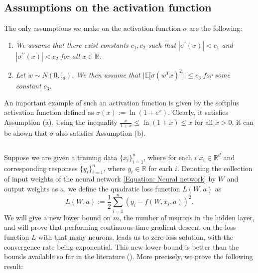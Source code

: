 \documentclass[a4paper,11pt]{amsart}
\newcommand{\IE}{\mathbb{E}}
\theoremstyle{definition}
\theoremstyle{plain}
\theoremstyle{remark}
\newcommand{\IR}{\mathbb{R}}
\begin{document}
\subsection*{Assumptions on the activation function}
The only assumptions we make on the activation function $\sigma$ are the following:
\begin{enumerate} 
\item[(a)]
{\it We assume that there exist constants $c_1,c_2$ such that $|\sigma^\prime(x)|<c_1$ and $|\sigma^{\prime\prime}(x)|<c_2$ for all $x\in\IR$.}
\item[(b)]
{\it Let $w\sim N(0,\mathbb{I}_d)$. We then assume that $\Big|\IE\Big[\sigma(w^Tx)^2\Big]\Big|\leq c_3$ for some constant $c_3$.}
\end{enumerate}
An important example of such an activation function is given  by the softplus activation function defined as
$\sigma(x):= \ln(1+e^{x})$.
Clearly, it satisfies Assumption (a). Using the inequality $\frac{x}{1+x}\leq \ln(1+x)\leq x$ for all $x>0$, it can be shown that $\sigma$ also satisfies Assumption (b). 

\subsection*{}
Suppose we are given a training data $\{x_i\}_{i=1}^n$, where for each $i$ $x_i\in\IR^d$ and corresponding responses $\{y_i\}_{i=1}^n$, where $y_i\in\IR$ for each $i$. Denoting the collection of input weights of the neural network \eqref{Equation: Neural network} by $W$ and output weights as $a$, we define the quadratic loss function $L(W,a)$ as
\begin{equation}\label{Equation: Quadratic loss function}
L(W,a):=\frac{1}{2}\sum_{i=1}^n(y_i-f(W,x_i,a))^2.
\end{equation}
We will give a new lower bound on $m$, the number of neurons in the hidden layer, and will prove that performing continuous-time gradient descent on the loss function $L$ with that many neurons, leads us to zero-loss solution, with the convergence rate being exponential. This new lower bound is better than the bounds available so far in the literature (\cite{gdescentOverPara1, gdescentOverPara2}). More precisely, we prove the following result:
\end{document}
